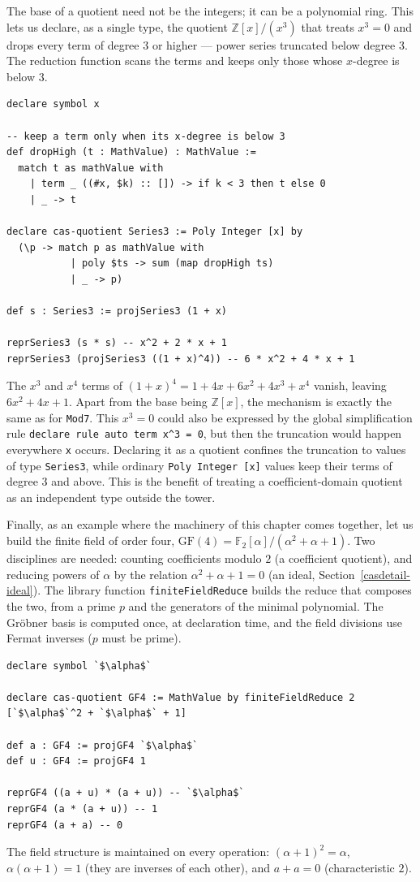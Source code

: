 The base of a quotient need not be the integers; it can be a polynomial ring.
This lets us declare, as a single type, the quotient $\mathbb{Z}[x]/(x^3)$ that treats $x^3 = 0$ and drops every term of degree $3$ or higher --- power series truncated below degree $3$.
The reduction function scans the terms and keeps only those whose $x$-degree is below $3$.
\begin{lstlisting}[language=egison,numbers=none]
declare symbol x

-- keep a term only when its x-degree is below 3
def dropHigh (t : MathValue) : MathValue :=
  match t as mathValue with
    | term _ ((#x, $k) :: []) -> if k < 3 then t else 0
    | _ -> t

declare cas-quotient Series3 := Poly Integer [x] by
  (\p -> match p as mathValue with
           | poly $ts -> sum (map dropHigh ts)
           | _ -> p)

def s : Series3 := projSeries3 (1 + x)

reprSeries3 (s * s) -- x^2 + 2 * x + 1
reprSeries3 (projSeries3 ((1 + x)^4)) -- 6 * x^2 + 4 * x + 1
\end{lstlisting}
The $x^3$ and $x^4$ terms of $(1 + x)^4 = 1 + 4x + 6x^2 + 4x^3 + x^4$ vanish, leaving $6x^2 + 4x + 1$.
Apart from the base being $\mathbb{Z}[x]$, the mechanism is exactly the same as for \lstinline{Mod7}.
This $x^3 = 0$ could also be expressed by the global simplification rule \lstinline{declare rule auto term x^3 = 0}, but then the truncation would happen everywhere \lstinline{x} occurs.
Declaring it as a quotient confines the truncation to values of type \lstinline{Series3}, while ordinary \lstinline{Poly Integer [x]} values keep their terms of degree $3$ and above.
This is the benefit of treating a coefficient-domain quotient as an independent type outside the tower.

Finally, as an example where the machinery of this chapter comes together, let us build the finite field of order four, $\mathrm{GF}(4) = \mathbb{F}_2[\alpha]/(\alpha^2+\alpha+1)$.
Two disciplines are needed: counting coefficients modulo $2$ (a coefficient quotient), and reducing powers of $\alpha$ by the relation $\alpha^2 + \alpha + 1 = 0$ (an ideal, Section~\ref{casdetail-ideal}).
The library function \lstinline{finiteFieldReduce} builds the reduce that composes the two, from a prime $p$ and the generators of the minimal polynomial.
The Gr\"obner basis is computed once, at declaration time, and the field divisions use Fermat inverses ($p$ must be prime).
\begin{lstlisting}[language=egison,numbers=none]
declare symbol `$\alpha$`

declare cas-quotient GF4 := MathValue by finiteFieldReduce 2 [`$\alpha$`^2 + `$\alpha$` + 1]

def a : GF4 := projGF4 `$\alpha$`
def u : GF4 := projGF4 1

reprGF4 ((a + u) * (a + u)) -- `$\alpha$`
reprGF4 (a * (a + u)) -- 1
reprGF4 (a + a) -- 0
\end{lstlisting}
The field structure is maintained on every operation: $(\alpha+1)^2 = \alpha$, $\alpha(\alpha+1) = 1$ (they are inverses of each other), and $a + a = 0$ (characteristic $2$).

